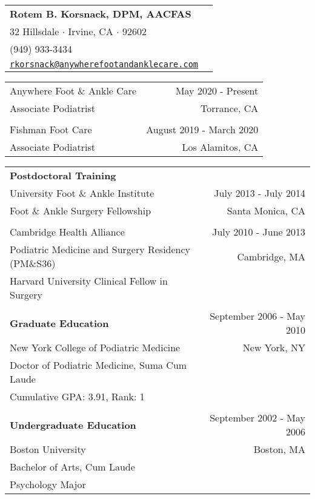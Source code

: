 \documentclass[letterpaper,10pt]{article}
\newcommand{\len}{7in}
\newcommand{\resheading}[1]{
  \colorbox{mygrey}{
    \begin{minipage}{6.9in}
      \center{\textbf{\large #1}}
    \end{minipage}
  }
}
\begin{document}
\begin{tabular*}{\len}{@{\extracolsep{\fill}}lr}
    \textbf{\LARGE Rotem B. Korsnack, DPM, AACFAS} & \\ 
    32 Hillsdale $\cdot$ Irvine, CA $\cdot$ 92602 & \\
    (949) 933-3434 & \\
    \href{mailto:rkorsnack@anywherefootandanklecare.com}{\texttt{rkorsnack@anywherefootandanklecare.com}} & \\
\end{tabular*}
\resheading{Experience}
\begin{tabular*}{\len}{@{\extracolsep{\fill}}lr}
    Anywhere Foot \& Ankle Care & May 2020 - Present \\
    Associate Podiatrist & Torrance, CA \\
    \\
    Fishman Foot Care & August 2019 - March 2020 \\
    Associate Podiatrist  & Los Alamitos, CA \\
\end{tabular*}
\resheading{Education}
\begin{tabular*}{\len}{@{\extracolsep{\fill}}lr}
    \textbf{Postdoctoral Training} \\
    University Foot \& Ankle Institute & July 2013 - July 2014 \\
    Foot \& Ankle Surgery Fellowship & Santa Monica, CA \\
    \\
    Cambridge Health Alliance & July 2010 - June 2013 \\
    Podiatric Medicine and Surgery Residency (PM\&S36) & Cambridge, MA \\
    Harvard University Clinical Fellow in Surgery \\
    \\
    \textbf{Graduate Education} & September 2006 - May 2010 \\
    New York College of Podiatric Medicine & New York, NY \\
    Doctor of Podiatric Medicine, Suma Cum Laude \\
	Cumulative GPA: 3.91, Rank: 1 \\
    \\
    \textbf{Undergraduate Education} & September 2002 - May 2006 \\
    Boston University & Boston, MA \\
    Bachelor of Arts, Cum Laude \\
    Psychology Major \\
\end{tabular*}
\end{document}
